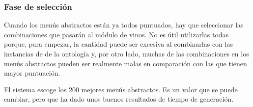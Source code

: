 \subsubsection{Fase de selección}
Cuando los menús abstractos están ya todos puntuados, hay que seleccionar las
combinaciones que pasarán al módulo de vinos. No es útil utilizarlas todas
porque, para empezar, la cantidad puede ser excesiva al combinarlas con las
instancias de  de la ontología y, por otro lado, muchas de las
combinaciones en los menús abstractos pueden ser realmente malas en comparación
con las que tienen mayor puntuación.

El sistema escoge los 200 mejores menús abstractos. Es un valor que se puede
cambiar, pero que ha dado unos buenos resultados de tiempo de
generación.
